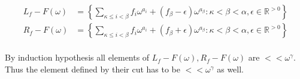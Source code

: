 \documentclass{article}
\newcommand{\curly}[1]{\left\{ #1 \right\}}
\newcommand{\R}{\mathbb{R}}
\newcommand{\w}{\omega}
\begin{document}
\begin{align*}
  L_f - F(\w) &= \curly{\sum_{\kappa \leq i < \beta} f_i \w^{a_i} + (f_\beta - \epsilon) \w^{a_\beta}
	\colon \kappa < \beta < \alpha, \epsilon \in \R^{>0}} \\
  R_f - F(\w) &= \curly{\sum_{\kappa \leq i < \beta} f_i \w^{a_i} + (f_\beta + \epsilon) \w^{a_\beta}
	\colon \kappa < \beta < \alpha, \epsilon \in \R^{>0}} \\
\end{align*}

By induction hypothesis all elements of $L_f - F(\w), R_f - F(\w)$ are $<< \w^\gamma$. Thus the element defined by their cut has to be $<< \w^\gamma$ as well.
\end{document}
